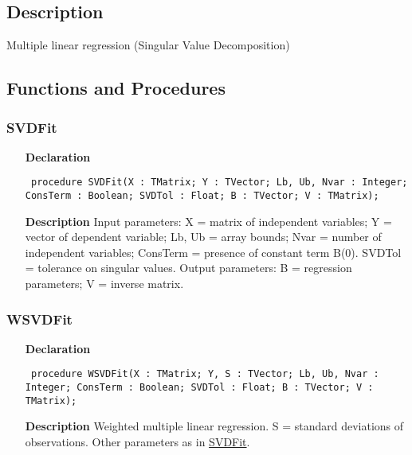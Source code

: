 \documentclass[12pt,a4paper,oneside]{report}
\newcommand{\declarationitem}[1]{\textbf{#1}}
\newcommand{\descriptiontitle}[1]{\textbf{#1}}
\newcommand{\code}[1]{\texttt{#1}}
\begin{document}
\subsection{Description}
Multiple linear regression (Singular Value Decomposition) 
\subsection{Functions and Procedures}
\subsubsection{SVDFit}
\label{usvdfit-SVDFit}
\begin{itemize}\item[\declarationitem{Declaration}\hfill]
	\begin{flushleft}
		\code{
			procedure SVDFit(X : TMatrix; Y : TVector; Lb, Ub, Nvar : Integer; ConsTerm : Boolean; SVDTol : Float; B : TVector; V : TMatrix);}
		
	\end{flushleft}
	
	\par
	\item[\descriptiontitle{Description}]
	Input parameters: X = matrix of independent variables; Y = vector of dependent variable; Lb, Ub = array bounds; Nvar = number of independent variables; ConsTerm = presence of constant term B(0). SVDTol = tolerance on singular values. Output parameters: B = regression parameters; V = inverse matrix.
	
\end{itemize}
\subsubsection{WSVDFit}
\label{usvdfit-WSVDFit}
\begin{itemize}\item[\declarationitem{Declaration}\hfill]
	\begin{flushleft}
		\code{
			procedure WSVDFit(X : TMatrix; Y, S : TVector; Lb, Ub, Nvar : Integer; ConsTerm : Boolean; SVDTol : Float; B : TVector; V : TMatrix);}
		
	\end{flushleft}
	
	\par
	\item[\descriptiontitle{Description}]
	Weighted multiple linear regression. S = standard deviations of observations. Other parameters as in \hyperref[usvdfit-SVDFit]{SVDFit}.
	
\end{itemize}
\end{document}
